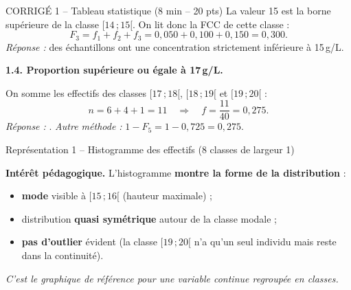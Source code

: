 \documentclass[11pt,a4paper]{article}
\begin{document}
\begin{epreuve}{CORRIGÉ 1 -- Tableau statistique \hfill \small (8 min -- 20 pts)}
La valeur 15 est la borne supérieure de la classe $[14\,;15[$. On lit donc la FCC de cette classe :
$$F_3 = f_1+f_2+f_3 = 0{,}050+0{,}100+0{,}150 = 0{,}300.$$
\emph{Réponse :}  des échantillons ont une concentration strictement inférieure à 15\,g/L.

\vspace{0.3cm}
\textbf{1.4. Proportion supérieure ou égale à 17\,g/L.}

On somme les effectifs des classes $[17\,;18[$, $[18\,;19[$ et $[19\,;20[$ :
$$n = 6 + 4 + 1 = 11 \quad\Rightarrow\quad f = \frac{11}{40} = 0{,}275.$$
\emph{Réponse :} .
\emph{Autre méthode :} $1 - F_5 = 1 - 0{,}725 = 0{,}275$.

\end{epreuve}

\vspace{0.3cm}

\begin{vignetteCours}{Représentation 1 -- Histogramme des effectifs (8 classes de largeur 1)}
\begin{center}
\end{center}
\textbf{Intérêt pédagogique.} L'histogramme \textbf{montre la forme de la distribution} :
\begin{itemize}[leftmargin=*,itemsep=1pt]
  \item \textbf{mode} visible à $[15\,;16[$ (hauteur maximale) ;
  \item distribution \textbf{quasi symétrique} autour de la classe modale ;
  \item \textbf{pas d'outlier} évident (la classe $[19\,;20[$ n'a qu'un seul individu mais reste dans la continuité).
\end{itemize}
\emph{C'est le graphique de référence pour une variable continue regroupée en classes.}
\end{vignetteCours}
\end{document}
